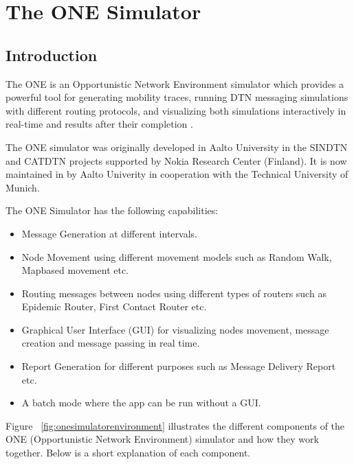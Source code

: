 \newpage
\section{The ONE Simulator}
\subsection{Introduction}
The ONE is an Opportunistic Network Environment simulator \cite{the-one} which provides a powerful tool for generating mobility traces, running DTN messaging simulations with different routing protocols, and visualizing both simulations interactively in real-time and results after their completion \cite{the-one-ari}.

The ONE simulator was originally developed in Aalto University in the SINDTN \cite{sindtn} and CATDTN projects supported by Nokia Research Center (Finland). It is now maintained in by Aalto Univerity in cooperation with the Technical University of Munich.\newline

The ONE Simulator has the following capabilities:
\begin{itemize}
  \item Message Generation at different intervals.
  \item Node Movement using different movement models such as Random Walk, Mapbased movement etc.
  \item Routing messages between nodes using different types of routers such as Epidemic Router, First Contact Router etc.
  \item Graphical User Interface (GUI) for visualizing nodes movement, message creation and message passing in real time.
  \item Report Generation for different purposes such as Message Delivery Report etc.
  \item A batch mode where the app can be run without a GUI.
\end{itemize}

Figure ~\ref{fig:onesimulatorenvironment} illustrates the different components of the ONE (Opportunistic Network Environment) simulator and how they work together. Below is a short explanation of each component.

